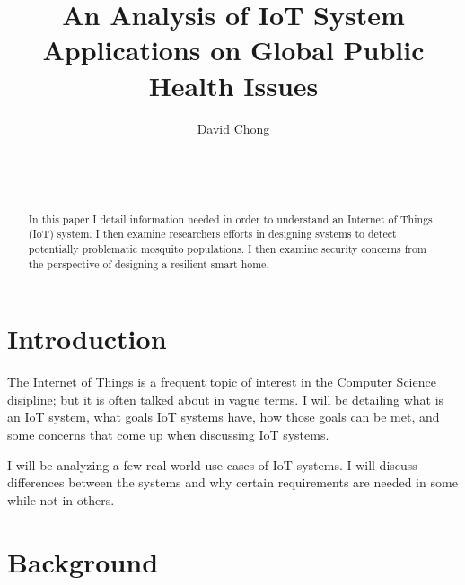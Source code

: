 \documentclass{sig-alternate}
\begin{document}

\title{An Analysis of IoT System Applications on Global Public Health Issues}


\author{
\alignauthor
David Chong\\
	\\
	\\
	\\
}

\maketitle
\begin{abstract}
In this paper I detail information needed in order to understand an Internet of Things (IoT) system. I then examine researchers efforts in designing systems to detect potentially problematic mosquito populations. I then examine security concerns from the perspective of designing a resilient smart home.
\end{abstract}


\section{Introduction}
\label{sec:introduction}

The Internet of Things is a frequent topic of interest in the Computer Science disipline; but it is often talked about in vague terms. I will be detailing what is an IoT system, what goals IoT systems have, how those goals can be met, and some concerns that come up when discussing IoT systems.

I will be analyzing a few real world use cases of IoT systems. I will discuss differences between the systems and why certain requirements are needed in some while not in others.

\section{Background}
\label{sec:background}
\end{document}
